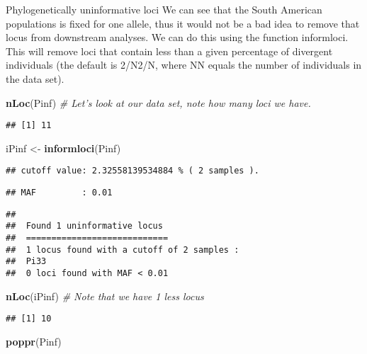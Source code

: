 \documentclass[12pt,]{krantz}
\newenvironment{Shaded}{\begin{snugshade}}{\end{snugshade}}
\newcommand{\KeywordTok}[1]{\textcolor[rgb]{0.27,0.27,0.27}{\textbf{#1}}}
\newcommand{\StringTok}[1]{\textcolor[rgb]{0.5,0.5,0.5}{#1}}
\newcommand{\CommentTok}[1]{\textcolor[rgb]{0.56,0.35,0.01}{\textit{#1}}}
\newcommand{\NormalTok}[1]{#1}
\theoremstyle{definition}
\theoremstyle{definition}
\theoremstyle{definition}
\theoremstyle{remark}
\begin{document}
Phylogenetically uninformative loci We can see that the South American
populations is fixed for one allele, thus it would not be a bad idea to
remove that locus from downstream analyses. We can do this using the
function informloci. This will remove loci that contain less than a
given percentage of divergent individuals (the default is 2/N2/N, where
NN equals the number of individuals in the data set).

\begin{Shaded}
\begin{Highlighting}[]
\KeywordTok{nLoc}\NormalTok{(Pinf)  }\CommentTok{# Let's look at our data set, note how many loci we have.}
\end{Highlighting}
\end{Shaded}

\begin{verbatim}
## [1] 11
\end{verbatim}

\begin{Shaded}
\begin{Highlighting}[]
\NormalTok{iPinf <-}\StringTok{ }\KeywordTok{informloci}\NormalTok{(Pinf)}
\end{Highlighting}
\end{Shaded}

\begin{verbatim}
## cutoff value: 2.32558139534884 % ( 2 samples ).
\end{verbatim}

\begin{verbatim}
## MAF         : 0.01
\end{verbatim}

\begin{verbatim}
## 
##  Found 1 uninformative locus 
##  ============================ 
##  1 locus found with a cutoff of 2 samples :
##  Pi33 
##  0 loci found with MAF < 0.01
\end{verbatim}

\begin{Shaded}
\begin{Highlighting}[]
\KeywordTok{nLoc}\NormalTok{(iPinf) }\CommentTok{# Note that we have 1 less locus}
\end{Highlighting}
\end{Shaded}

\begin{verbatim}
## [1] 10
\end{verbatim}

\begin{Shaded}
\begin{Highlighting}[]
\KeywordTok{poppr}\NormalTok{(Pinf)}
\end{Highlighting}
\end{Shaded}
\end{document}
